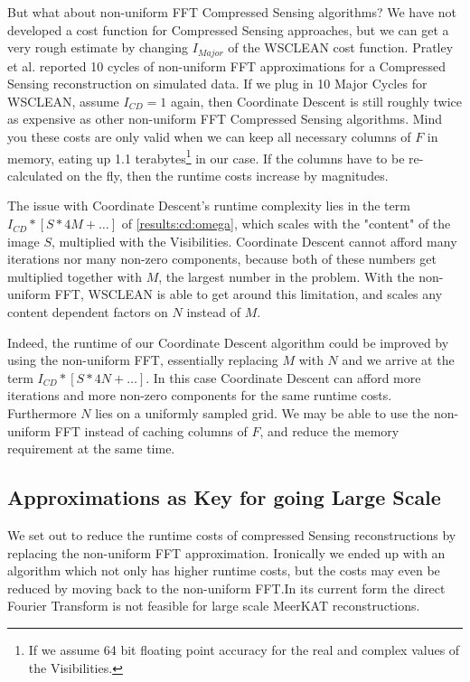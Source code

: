 But what about non-uniform FFT Compressed Sensing algorithms? We have not developed a cost function for Compressed Sensing approaches, but we can get a very rough estimate by changing $I_{Major}$ of the WSCLEAN cost function. Pratley et al.\cite{pratley2018fast} reported 10 cycles of non-uniform FFT approximations for a Compressed Sensing reconstruction on simulated data. If we plug in 10 Major Cycles for WSCLEAN, assume $I_{CD}=1$ again, then Coordinate Descent is still roughly twice as expensive as other non-uniform FFT Compressed Sensing algorithms. Mind you these costs are only valid when we can keep all necessary columns of $F$ in memory, eating up 1.1 terabytes\footnote{If we assume 64 bit floating point accuracy for the real and complex values of the Visibilities.} in our case. If the columns have to be re-calculated on the fly, then the runtime costs increase by magnitudes.

The issue with Coordinate Descent's runtime complexity lies in the term $I_{CD} * [S * 4M +\ldots]$ of \eqref{results:cd:omega}, which scales with the "content" of the image $S$, multiplied with the Visibilities. Coordinate Descent cannot afford many iterations nor many non-zero components, because both of these numbers get multiplied together with $M$, the largest number in the problem. With the non-uniform FFT, WSCLEAN is able to get around this limitation, and scales any content dependent factors on $N$ instead of $M$. 

Indeed, the runtime of our Coordinate Descent algorithm could be improved by using the non-uniform FFT, essentially replacing $M$ with $N$ and we arrive at the term $I_{CD} * [S * 4N +\ldots]$. In this case Coordinate Descent can afford more iterations and more non-zero components for the same runtime costs. Furthermore $N$ lies on a uniformly sampled grid. We may be able to use the non-uniform FFT instead of caching columns of $F$, and reduce the memory requirement at the same time.


\subsection{Approximations as Key for going Large Scale}
We set out to reduce the runtime costs of compressed Sensing reconstructions by replacing the non-uniform FFT approximation. Ironically we ended up with an algorithm which not only has higher runtime costs, but the costs may even be reduced by moving back to the non-uniform FFT.In its current form the direct Fourier Transform is not feasible for large scale MeerKAT reconstructions.

